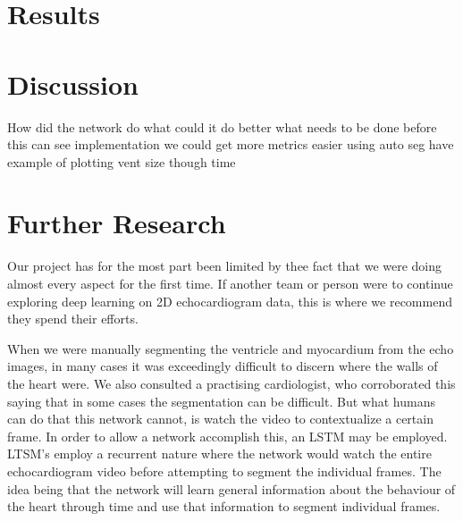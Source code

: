 \documentclass[12pt]{article}
\begin{document}
\section{Results}

\section{Discussion}
How did the network do
what could it do better
what needs to be done before this can see implementation
we could get more metrics easier using auto seg
have example of plotting vent size though time

\section{Further Research}
Our project has for the most part been limited by thee fact that we were doing almost every aspect for the first time.
If another team or person were to continue exploring deep learning on 2D echocardiogram data, this is where we recommend they spend their efforts.

When we were manually segmenting the ventricle and myocardium from the echo images, in many cases it was exceedingly difficult to discern where the walls of the heart were.
We also consulted a practising cardiologist, who corroborated this saying that in some cases the segmentation can be difficult.
But what humans  can do that this network cannot, is watch the video to contextualize a certain frame.
In order to allow a network accomplish this, an LSTM may be employed.
LTSM's employ a recurrent nature where the network would watch the entire echocardiogram video before attempting to segment the individual frames.
The idea being that the network will learn general information about the behaviour of the heart through time and use that information to segment individual frames.
\end{document}
